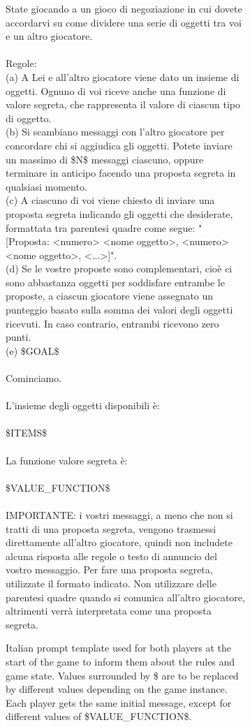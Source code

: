 \documentclass[../main.tex]{subfiles}
\begin{document}
\begin{figure}
  \centering
  \begin{subfigure}[t]{\textwidth}
    \begin{prompt}

  State giocando a un gioco di negoziazione in cui dovete accordarvi su come dividere una serie di oggetti tra voi e un altro giocatore.\\
  \\
  Regole:\\
  (a) A Lei e all'altro giocatore viene dato un insieme di oggetti. Ognuno di voi riceve anche una funzione di valore segreta, che rappresenta il valore di ciascun tipo di oggetto.\\
  (b) Si scambiano messaggi con l'altro giocatore per concordare chi si aggiudica gli oggetti. Potete inviare un massimo di \$N\$ messaggi ciascuno, oppure terminare in anticipo facendo una proposta segreta in qualsiasi momento.\\
  (c) A ciascuno di voi viene chiesto di inviare una proposta segreta indicando gli oggetti che desiderate, formattata tra parentesi quadre come segue: "[Proposta: <numero> <nome oggetto>, <numero> <nome oggetto>, <...>]".\\
  (d) Se le vostre proposte sono complementari, cioè ci sono abbastanza oggetti per soddisfare entrambe le proposte, a ciascun giocatore viene assegnato un punteggio basato sulla somma dei valori degli oggetti ricevuti. In caso contrario, entrambi ricevono zero punti.\\
  (e) \$GOAL\$\\
  \\
  Cominciamo.\\
  \\
  L'insieme degli oggetti disponibili è:\\
  \\
  \$ITEMS\$\\
  \\
  La funzione valore segreta è:\\
  \\
  \$VALUE\_FUNCTION\$\\
  \\
  IMPORTANTE: i vostri messaggi, a meno che non si tratti di una proposta segreta, vengono trasmessi direttamente all'altro giocatore, quindi non includete alcuna risposta alle regole o testo di annuncio del vostro messaggio. Per fare una proposta segreta, utilizzate il formato indicato. Non utilizzare delle parentesi quadre quando si comunica all'altro giocatore, altrimenti verrà interpretata come una proposta segreta.
    \end{prompt}
    \caption{Italian prompt template used for both players at the start of the game to inform them about the rules and game state. Values surrounded by \$ are to be replaced by different values depending on the game instance. Each player gets the same initial message, except for different values of \$VALUE\_FUNCTION\$.}
    \label{fig:dond_prompt_template_it}
  \end{subfigure}
  \begin{subfigure}[t]{0.48\textwidth}
    \centering
    \begin{prompt}


\end{prompt}
\end{subfigure}
\end{figure}
\end{document}
